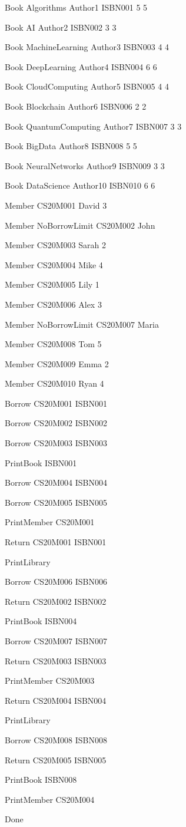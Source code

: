 Book
Algorithms Author1 ISBN001 5 5

Book
AI Author2 ISBN002 3 3

Book
MachineLearning Author3 ISBN003 4 4

Book
DeepLearning Author4 ISBN004 6 6

Book
CloudComputing Author5 ISBN005 4 4

Book
Blockchain Author6 ISBN006 2 2

Book
QuantumComputing Author7 ISBN007 3 3

Book
BigData Author8 ISBN008 5 5

Book
NeuralNetworks Author9 ISBN009 3 3

Book
DataScience Author10 ISBN010 6 6

Member
CS20M001 David 3

Member
NoBorrowLimit CS20M002 John

Member
CS20M003 Sarah 2

Member
CS20M004 Mike 4

Member
CS20M005 Lily 1

Member
CS20M006 Alex 3

Member
NoBorrowLimit CS20M007 Maria

Member
CS20M008 Tom 5

Member
CS20M009 Emma 2

Member
CS20M010 Ryan 4

Borrow
CS20M001 ISBN001

Borrow
CS20M002 ISBN002

Borrow
CS20M003 ISBN003

PrintBook
ISBN001

Borrow
CS20M004 ISBN004

Borrow
CS20M005 ISBN005

PrintMember
CS20M001

Return
CS20M001 ISBN001

PrintLibrary

Borrow
CS20M006 ISBN006

Return
CS20M002 ISBN002

PrintBook
ISBN004

Borrow
CS20M007 ISBN007

Return
CS20M003 ISBN003

PrintMember
CS20M003

Return
CS20M004 ISBN004

PrintLibrary

Borrow
CS20M008 ISBN008

Return
CS20M005 ISBN005

PrintBook
ISBN008

PrintMember
CS20M004

Done